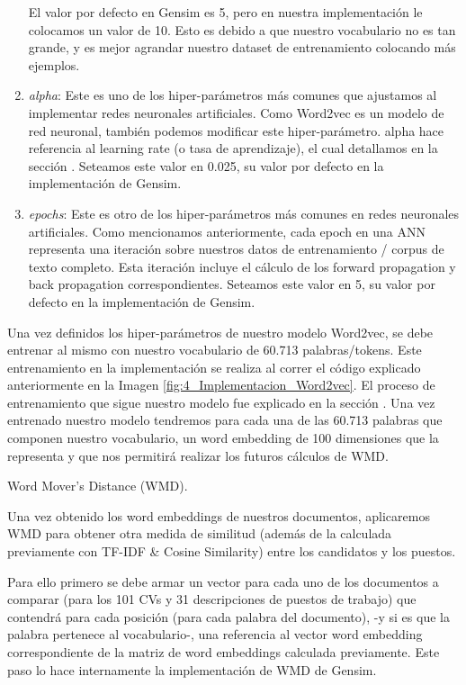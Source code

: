 \documentclass[12pt,a4paper]{article}
\makeatletter
\renewcommand\paragraph{\@startsection{paragraph}{4}{\z@}
            {-2.5ex\@plus -1ex \@minus -.25ex}
            {1.25ex \@plus .25ex}
            {\normalfont\normalsize\bfseries}}
\makeatother
\begin{document}
\begin{sloppypar}
\begin{enumerate}
El valor por defecto en Gensim es 5, pero en nuestra implementación le colocamos un valor de 10. Esto es debido a que nuestro vocabulario no es tan grande, y es mejor agrandar nuestro dataset de entrenamiento colocando más ejemplos.

\item \textit{alpha}: Este es uno de los hiper-parámetros más comunes que ajustamos al implementar redes neuronales artificiales. Como Word2vec es un modelo de red neuronal, también podemos modificar este hiper-parámetro. alpha hace referencia al learning rate (o tasa de aprendizaje), el cual detallamos en la sección \textit{}. Seteamos este valor en 0.025, su valor por defecto en la implementación de Gensim.

\item \textit{epochs}: Este es otro de los hiper-parámetros más comunes en redes neuronales artificiales. Como mencionamos anteriormente, cada epoch en una ANN representa una iteración sobre nuestros datos de entrenamiento / corpus de texto completo. Esta iteración incluye el cálculo de los forward propagation y back propagation correspondientes. Seteamos este valor en 5, su valor por defecto en la implementación de Gensim.

\end{enumerate}

Una vez definidos los hiper-parámetros de nuestro modelo Word2vec, se debe entrenar al mismo con nuestro vocabulario de 60.713 palabras/tokens. Este entrenamiento en la implementación se realiza al correr el código explicado anteriormente en la Imagen \ref{fig:4_Implementacion_Word2vec}. El proceso de entrenamiento que sigue nuestro modelo fue explicado en la sección \textit{}. Una vez entrenado nuestro modelo tendremos para cada una de las 60.713 palabras que componen nuestro vocabulario, un word embedding de 100 dimensiones que la representa y que nos permitirá realizar los futuros cálculos de WMD. 

\paragraph{Word Mover's Distance (WMD).}\label{calculo_wmd}

Una vez obtenido los word embeddings de nuestros documentos, aplicaremos WMD para obtener otra medida de similitud (además de la calculada previamente con TF-IDF \& Cosine Similarity) entre los candidatos y los puestos.

Para ello primero se debe armar un vector para cada uno de los documentos a comparar (para los 101 CVs y 31 descripciones de puestos de trabajo) que contendrá para cada posición (para cada palabra del documento), -y si es que la palabra pertenece al vocabulario-, una referencia al vector word embedding correspondiente de la matriz de word embeddings calculada previamente. Este paso lo hace internamente la implementación de WMD de Gensim.


\end{sloppypar}
\end{document}

